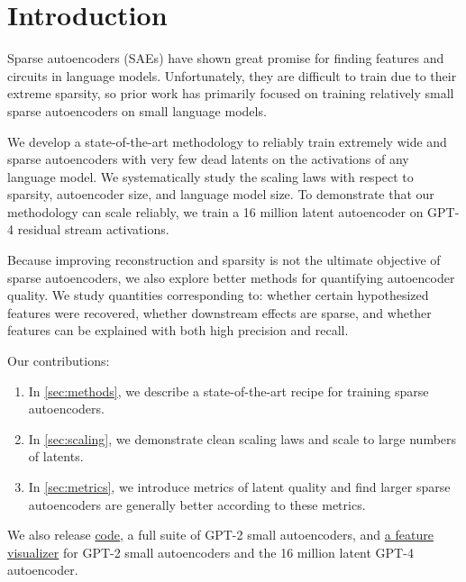 \section{Introduction}
Sparse autoencoders (SAEs) have shown great promise for finding features \citep{cunningham2023sparse,bricken2023monosemanticity,templeton2024scaling,goh2016decoding} and circuits \citep{marks2024sparse} in language models. Unfortunately, they are difficult to train due to their extreme sparsity, so prior work has primarily focused on training relatively small sparse autoencoders on small language models.



We develop a state-of-the-art methodology to reliably train extremely wide and sparse autoencoders with very few dead latents on the activations of any language model. We systematically study the scaling laws with respect to sparsity, autoencoder size, and language model size.  To demonstrate that our methodology can scale reliably, we train a 16 million latent autoencoder on GPT-4 \citep{openai2023gpt} residual stream activations.  %

Because improving reconstruction and sparsity is not the ultimate objective of sparse autoencoders, %
we also explore better methods for quantifying autoencoder quality. We study quantities corresponding to: whether certain hypothesized features were recovered, whether downstream effects are sparse, and whether features can be explained with both high precision and recall.  






Our contributions:
\vspace{-5pt}
\begin{enumerate}
    \item In \autoref{sec:methods}, we describe a state-of-the-art recipe for training sparse autoencoders. %
    \item In \autoref{sec:scaling}, we demonstrate clean scaling laws and scale to large numbers of latents.
    \item In \autoref{sec:metrics}, we introduce metrics of latent quality and find larger sparse autoencoders are generally better according to these metrics.%

\end{enumerate}
We also release \href{https://github.com/openai/sparse_autoencoder}{code}, a full suite of GPT-2 small autoencoders,
and \href{https://openaipublic.blob.core.windows.net/sparse-autoencoder/sae-viewer/index.html}{a feature visualizer} for GPT-2 small autoencoders and the 16 million latent GPT-4 autoencoder. %
\vspace{-5pt}






